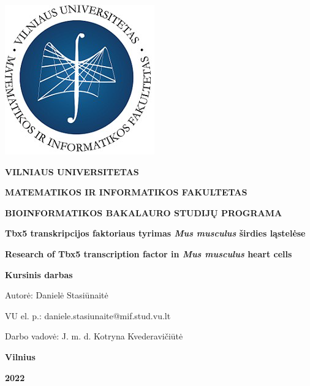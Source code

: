 \documentclass[12pt]{article}
\begin{document}

\begin{titlepage}
\vskip 20pt
\begin{center}
\includegraphics[scale=0.5]{MIF}
\end{center}


\vskip 20pt
\centerline{\bf \large \textbf{VILNIAUS UNIVERSITETAS}}
\bigskip
\centerline{\large \textbf{MATEMATIKOS IR INFORMATIKOS FAKULTETAS}}
\bigskip
\centerline{\large \textbf{BIOINFORMATIKOS BAKALAURO STUDIJŲ PROGRAMA}}

\vskip 90pt
\begin{center}
    {\bf \LARGE Tbx5 transkripcijos faktoriaus tyrimas \emph{Mus musculus}
     širdies ląstelėse}
\end{center}
\begin{center}
    {\bf \Large Research of Tbx5 transcription factor in \emph{Mus musculus}
     heart cells}
\end{center}
\vskip 20pt
\centerline{\bf \large \textbf{Kursinis darbas}}
\bigskip
\vskip 40pt

\hskip 140pt {\large Autorė: Danielė Stasiūnaitė}

\hskip 140pt{\large VU el. p.: daniele.stasiunaite@mif.stud.vu.lt}
\bigskip
\vskip 20pt

\hskip 140pt {\large Darbo vadovė: J. m. d. Kotryna Kvederavičiūtė}
\vskip 60pt
\vskip 40pt
\centerline{\large \textbf{Vilnius}}
\centerline{\large \textbf{2022}}
\newpage
\end{titlepage}


\tableofcontents
\newpage

\end{document}
